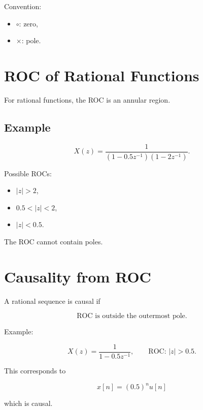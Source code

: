 Convention:

\begin{itemize}
\item \(\circ\): zero,
\item \(\times\): pole.
\end{itemize}


\section{ROC of Rational Functions}

For rational functions, the ROC is an annular region.


\subsection{Example}

\[
X(z)=
\frac{1}
{(1-0.5z^{-1})(1-2z^{-1})}.
\]

Possible ROCs:

\begin{itemize}
\item \(|z|>2\),
\item \(0.5<|z|<2\),
\item \(|z|<0.5\).
\end{itemize}

The ROC cannot contain poles.


\section{Causality from ROC}

A rational sequence is causal if

\[
\boxed{
\text{ROC is outside the outermost pole.}
}
\]

Example:

\[
X(z)=
\frac{1}{1-0.5z^{-1}},
\qquad
\text{ROC: }|z|>0.5.
\]

This corresponds to

\[
x[n]=(0.5)^n u[n]
\]

which is causal.


